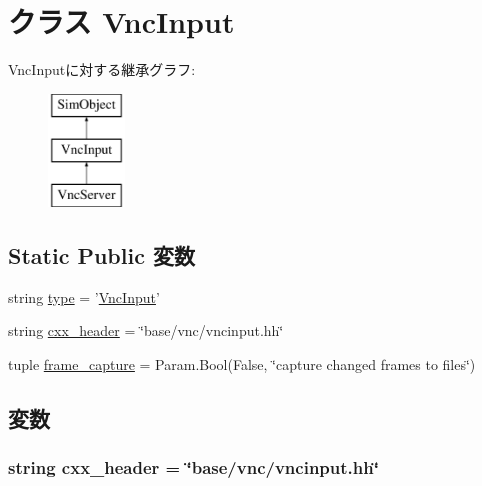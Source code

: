 \hypertarget{classVnc_1_1VncInput}{
\section{クラス VncInput}
\label{classVnc_1_1VncInput}
}
VncInputに対する継承グラフ:\begin{figure}[H]
\begin{center}
\leavevmode
\includegraphics[height=3cm]{classVnc_1_1VncInput}
\end{center}
\end{figure}
\subsection*{Static Public 変数}
\begin{DoxyCompactItemize}
\item 
string \hyperlink{classVnc_1_1VncInput_acce15679d830831b0bbe8ebc2a60b2ca}{type} = '\hyperlink{classVnc_1_1VncInput}{VncInput}'
\item 
string \hyperlink{classVnc_1_1VncInput_a17da7064bc5c518791f0c891eff05fda}{cxx\_\-header} = \char`\"{}base/vnc/vncinput.hh\char`\"{}
\item 
tuple \hyperlink{classVnc_1_1VncInput_a4c10beaa6887df59fa47981a61d1b8c3}{frame\_\-capture} = Param.Bool(False, \char`\"{}capture changed frames to files\char`\"{})
\end{DoxyCompactItemize}


\subsection{変数}
\hypertarget{classVnc_1_1VncInput_a17da7064bc5c518791f0c891eff05fda}{
\subsubsection[{cxx\_\-header}]{\setlength{\rightskip}{0pt plus 5cm}string {\bf cxx\_\-header} = \char`\"{}base/vnc/vncinput.hh\char`\"{}}}
\label{classVnc_1_1VncInput_a17da7064bc5c518791f0c891eff05fda}


